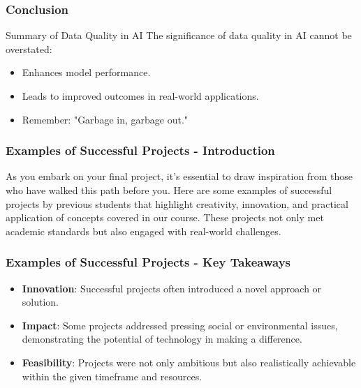 \documentclass[aspectratio=169]{beamer}
\begin{document}
\begin{frame}[fragile]
    \frametitle{Conclusion}
    \begin{block}{Summary of Data Quality in AI}
        The significance of data quality in AI cannot be overstated:
        \begin{itemize}
            \item Enhances model performance.
            \item Leads to improved outcomes in real-world applications.
            \item Remember: "Garbage in, garbage out."
        \end{itemize}
    \end{block}
\end{frame}

\begin{frame}[fragile]
    \frametitle{Examples of Successful Projects - Introduction}
    As you embark on your final project, it's essential to draw inspiration from those who have walked this path before you. 
    Here are some examples of successful projects by previous students that highlight creativity, innovation, and practical application of concepts covered in our course. 
    These projects not only met academic standards but also engaged with real-world challenges.
\end{frame}

\begin{frame}[fragile]
    \frametitle{Examples of Successful Projects - Key Takeaways}
    \begin{itemize}
        \item \textbf{Innovation}: Successful projects often introduced a novel approach or solution.
        \item \textbf{Impact}: Some projects addressed pressing social or environmental issues, demonstrating the potential of technology in making a difference.
        \item \textbf{Feasibility}: Projects were not only ambitious but also realistically achievable within the given timeframe and resources.
    \end{itemize}
\end{frame}
\end{document}
